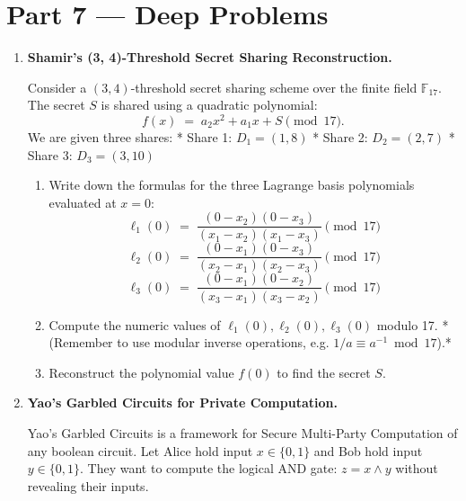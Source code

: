 \documentclass[12pt, a4paper]{book}
\begin{document}
\section{Part 7 --- Deep Problems}

\begin{deepbox}
\begin{enumerate}[label=\textbf{D\arabic*.}]
  \item \textbf{Shamir's (3, 4)-Threshold Secret Sharing Reconstruction.}
  
        Consider a $(3, 4)$-threshold secret sharing scheme over the finite field $\mathbb{F}_{17}$.
        The secret $S$ is shared using a quadratic polynomial:
        \[
          f(x) \;=\; a_2 x^2 + a_1 x + S \pmod{17}.
        \]
        We are given three shares:
        * Share 1: $D_1 = (1, 8)$
        * Share 2: $D_2 = (2, 7)$
        * Share 3: $D_3 = (3, 10)$
        
        \begin{enumerate}[label=(\alph*)]
          \item Write down the formulas for the three Lagrange basis polynomials evaluated at $x = 0$:
                \[
                  \ell_1(0) \;=\; \frac{(0-x_2)(0-x_3)}{(x_1-x_2)(x_1-x_3)} \pmod{17}
                \]
                \[
                  \ell_2(0) \;=\; \frac{(0-x_1)(0-x_3)}{(x_2-x_1)(x_2-x_3)} \pmod{17}
                \]
                \[
                  \ell_3(0) \;=\; \frac{(0-x_1)(0-x_2)}{(x_3-x_1)(x_3-x_2)} \pmod{17}
                \]
          \item Compute the numeric values of $\ell_1(0), \ell_2(0), \ell_3(0)$ modulo 17.
                *(Remember to use modular inverse operations, e.g. $1/a \equiv a^{-1} \bmod 17$).*
          \item Reconstruct the polynomial value $f(0)$ to find the secret $S$.
        \end{enumerate}

  \item \textbf{Yao's Garbled Circuits for Private Computation.}
  
        Yao's Garbled Circuits is a framework for Secure Multi-Party Computation of any boolean circuit.
        Let Alice hold input $x \in \{0, 1\}$ and Bob hold input $y \in \{0, 1\}$.
        They want to compute the logical AND gate: $z = x \land y$ without revealing their inputs.
        

\end{enumerate}
\end{deepbox}
\end{document}
